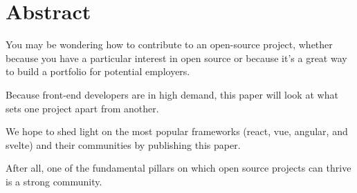 \section{Abstract}
You may be wondering how to contribute to an open-source project, whether because you have a particular interest in open source or because it's a great way to build a portfolio for potential employers.

Because front-end developers are in high demand, this paper will look at what sets one project apart from another.

We hope to shed light on the most popular frameworks (react, vue, angular, and svelte) and their communities by publishing this paper.

After all, one of the fundamental pillars on which open source projects can thrive is a strong community.